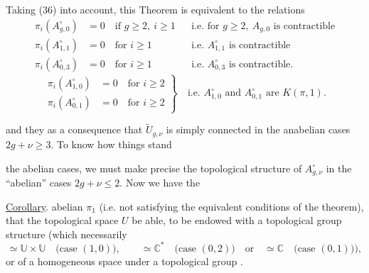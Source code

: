 Taking (36) into account, this Theorem is equivalent to the relations
\[
\tag{37}
\begin{aligned}
\pi_i(A_{g,0}^{\circ})&=0\quad\text{if }g\geq2,\ i\geq1
&&\text{i.e. for }g\geq2,\ A_{g,0}\text{ is contractible}\\
\pi_i(A_{1,1}^{\circ})&=0\quad\text{for }i\geq1
&&\text{i.e. }A_{1,1}^{\circ}\text{ is contractible}\\
\pi_i(A_{0,3}^{\circ})&=0\quad\text{for }i\geq1
&&\text{i.e. }A_{0,3}^{\circ}\text{ is contractible}.
\end{aligned}
\]
\[
\tag{38}
\left.\begin{aligned}
\pi_i(A_{1,0}^{\circ})&=0\quad\text{for }i\geq2\\
\pi_i(A_{0,1}^{\circ})&=0\quad\text{for }i\geq2
\end{aligned}\right\}
\quad\text{i.e. }A_{1,0}^{\circ}\text{ and }A_{0,1}^{\circ}\text{ are }K(\pi,1).
\]

and they  as a consequence that $\widetilde U_{g,\nu}$ is simply connected in the anabelian cases $2g+\nu\geq3$. To know how things stand

 the abelian cases, we must make precise the topological structure of $A_{g,\nu}^{\circ}$ in the  ``abelian'' cases $2g+\nu\leq2$. Now we have the

\uline{Corollary}.   abelian $\pi_1$ (i.e. not satisfying the equivalent conditions of the theorem),  that the topological space $U$  be able,  to be endowed with a topological group structure (which  necessarily
\[
\simeq\mathbb U\times\mathbb U\quad\text{(case }(1,0)\text{)},\qquad
\simeq\mathbb C^*\quad\text{(case }(0,2)\text{)}\quad\text{or}\quad
\simeq\mathbb C\quad\text{(case }(0,1)\text{)}),
\]
or  of a homogeneous space under a topological group .


